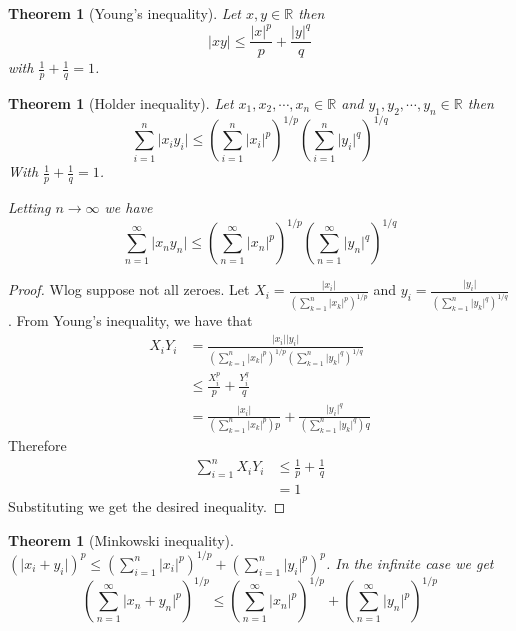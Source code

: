 \documentclass[11pt,a4paper]{article}
\theoremstyle{definition}
\theoremstyle{plain}
\newtheorem{theorem}[definition]{Theorem}
\theoremstyle{remark}
\newcommand{\R}{\mathbb{R}}
\newcommand{\abs}[1]{\lvert #1 \rvert}
\newcommand{\1}{\mathbbm{1}}
\begin{document}
\begin{theorem}[Young's inequality]
    Let $x,y \in \R$ then 
    $$\abs{xy} \le \frac{\abs{x}^p}{p} + \frac{\abs{y}^q}{q}$$
    with $\frac{1}{p} + \frac{1}{q} = 1$. 
\end{theorem}

\begin{theorem}[Holder inequality]
    Let $x_1, x_2, \cdots, x_n \in \R$ and $y_1, y_2, \cdots, y_n \in \R$ then 
    $$\sum_{i=1}^n \abs{x_iy_i} \le \left(\sum_{i=1}^n \abs{x_i}^p\right)^{1/p} \left(\sum_{i=1}^n \abs{y_i}^{q}\right)^{1/q}$$
    With $\frac{1}{p} + \frac{1}{q} = 1$.

    Letting $n \to \infty$ we have 
    $$\sum_{n=1}^\infty \abs{x_n y_n} \le \left(\sum_{n=1}^\infty \abs{x_n}^p\right)^{1/p} \left(\sum_{n=1}^\infty \abs{y_n}^q\right)^{1/q}$$
\end{theorem}

\begin{proof}
    Wlog suppose not all zeroes. Let $X_i = \frac{\abs{x_i}}{\left(\sum_{k=1}^n \abs{x_k}^p\right)^{1/p}}$ and $y_i = \frac{\abs{y_i}}{\left(\sum_{k=1}^n \abs{y_k}^q\right)^{1/q}}$. 
    From Young's inequality, we have that 
    \begin{align*}
        X_i Y_i &= \frac{\abs{x_i} \abs{y_i}}{\left(\sum_{k=1}^n \abs{x_k}^p\right)^{1/p} \left(\sum_{k=1}^n \abs{y_k}^q\right)^{1/q}} \\
        &\le \frac{X_i^p}{p}  + \frac{Y_i^q}{q} \\
        &= \frac{\abs{x_i}}{\left(\sum_{k=1}^n \abs{x_k}^p\right)p} + \frac{\abs{y_i}^q}{\left(\sum_{k=1}^n \abs{y_k}^q\right)q}
    \end{align*}
    Therefore 
    \begin{align*}
        \sum_{i=1}^n X_i Y_i &\le \frac{1}{p} + \frac{1}{q}\\
        &= 1
    \end{align*}
    Substituting we get the desired inequality.
\end{proof}

\begin{theorem}[Minkowski inequality]
    $\left(\abs{x_i + y_i}\right)^p \le \left(\sum_{i=1}^n \abs{x_i}^p\right)^{1/p} + \left(\sum_{i=1}^n \abs{y_i}^p\right)^p$. In the infinite case we get 
    $$\left(\sum_{n=1}^\infty \abs{x_n + y_n}^p\right)^{1/p} \le \left(\sum_{n=1}^\infty \abs{x_n}^p\right)^{1/p} + \left(\sum_{n=1}^\infty \abs{y_n}^p\right)^{1/p}$$
\end{theorem}
\end{document}
